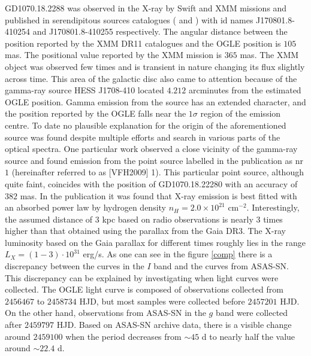 \documentclass{pracalicmgr}
\begin{document}
GD1070.18.2288 was observed in the X-ray by Swift and XMM missions and published in serendipitous sources catalogues
(\citet{evans_2sxps_2020} and \citet{traulsen_xmm-newton_2020}) with id names J170801.8-410254 and J170801.8-410255
respectively. The angular distance between the position reported by the XMM DR11 catalogues \citep{traulsen_xmm-newton_2020} and the OGLE position is $105$ mas.
The positional value reported by the XMM mission is $365$ mas. The XMM object was observed few times and is transient in nature changing its flux slightly across time.
This area of the galactic disc also came to attention because of the gamma-ray source HESS J1708-410 \citep{aharonian_hess_2008} located $4.212$ arcminutes from the estimated OGLE position. 
Gamma emission from the source has an extended character, and the position reported by the OGLE falls near the $1\sigma$ region of the emission centre.
To date no plausible explanation for the origin
of the aforementioned source was found despite multiple efforts and search in various parts of the optical spectra.
One particular work \citep{van_etten_multi-wavelength_2009} observed a close vicinity of
the gamma-ray source and found emission from the point source labelled in the publication as nr $1$ (hereinafter referred to as [VFH2009] 1).
This particular point source, although quite faint, coincides with the position of GD1070.18.22280 with an accuracy of $382$ mas. 
In the publication it was found that X-ray emission is best fitted with an absorbed power law by hydrogen density $n_H=2.0\times 10^{21}$ $\textrm{cm}^{-2}$.
Interestingly, the assumed distance of $3$ kpc based on radio observations is nearly $3$ times higher than that obtained using the parallax from the Gaia DR3.
The X-ray luminosity based on the Gaia parallax for different times roughly lies in the range $L_{X}=(1-3)\cdot10^{31}$ erg/s.\hfil \break%
\hspace*{17.62482 pt} As one can see in the figure \ref{comp} there is a discrepancy between the curves in the $I$ band and the curves from ASAS-SN.
This discrepancy can be explained by investigating when light curves were collected. The OGLE
light curve is composed of observations collected from $2456467$ to $2458734$ HJD, but most samples were collected before $2457201$ HJD.
On the other hand, observations from ASAS-SN in the $g$ band were collected after $2459797$ HJD. Based on ASAS-SN archive data,
there is a visible change around $2459100$ when the period decreases from $\sim 45$ d to nearly half the value around $\sim22.4$ d.
\end{document}
